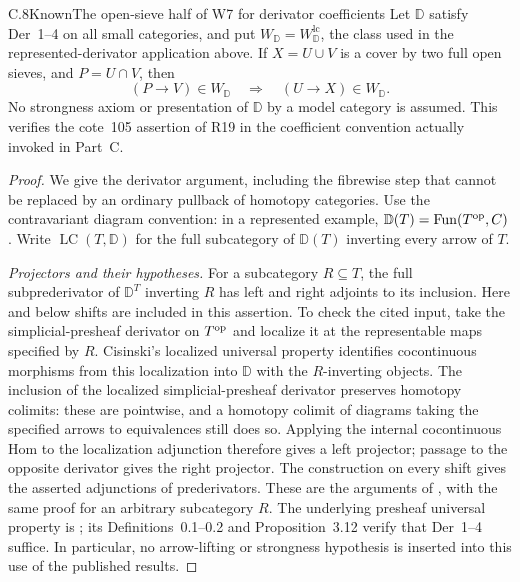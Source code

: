 \begin{claim}{C.8}{Known}{The open-sieve half of W7 for derivator coefficients}
\label{C:derivator-gluing}
Let $\mathbb D$ satisfy Der~1--4 on all small categories, and put
$W_{\mathbb D}=W^{\mathrm{lc}}_{\mathbb D}$, the class used in
the represented-derivator application above. If $X=U\cup V$
is a cover by two full open sieves, and $P=U\cap V$, then
\[
 (P\longrightarrow V)\in W_{\mathbb D}
 \quad\Longrightarrow\quad
 (U\longrightarrow X)\in W_{\mathbb D}.
 \tag{C.8.1}
\]
No strongness axiom or presentation of $\mathbb D$ by a model
category is assumed. This verifies the cote~105 assertion of
R19 in the coefficient convention actually invoked in Part~C.
\end{claim}
\begin{proof}
We give the derivator argument, including the fibrewise step
that cannot be replaced by an ordinary pullback of homotopy
categories. Use the contravariant diagram convention:
in a represented example, $\mathbb D(T)=\operatorname{Fun}(T^{\mathrm{op}},C)$.
Write $\operatorname{LC}(T,\mathbb D)$ for the full subcategory
of $\mathbb D(T)$ inverting every arrow of $T$.

\emph{Projectors and their hypotheses.}
For a subcategory $R\subseteq T$, the full subprederivator of
$\mathbb D^T$ inverting $R$ has left and right adjoints to its
inclusion. Here and below shifts are included in this assertion.
To check the cited input, take the simplicial-presheaf derivator
on $T^{\mathrm{op}}$ and localize it at the representable maps specified
by $R$. Cisinski's localized universal property identifies
cocontinuous morphisms from this localization into $\mathbb D$
with the $R$-inverting objects. The inclusion of the localized
simplicial-presheaf derivator preserves homotopy colimits:
these are pointwise, and a homotopy colimit of diagrams taking
the specified arrows to equivalences still does so. Applying
the internal cocontinuous Hom to the localization adjunction
therefore gives a left projector; passage to the opposite
derivator gives the right projector. The construction on every
shift gives the asserted adjunctions of prederivators.
These are the arguments of \cite[Theorem~3.6, Lemma~3.9,
Proposition~3.10 and Theorem~3.13]{CDCisinski2009}, with the
same proof for an arbitrary subcategory $R$. The underlying
presheaf universal property is
\cite[Corollary~3.26]{CDCisinski2008}; its Definitions~0.1--0.2
and Proposition~3.12 verify that Der~1--4 suffice. In
particular, no arrow-lifting or strongness hypothesis is
inserted into this use of the published results.


\end{proof}
